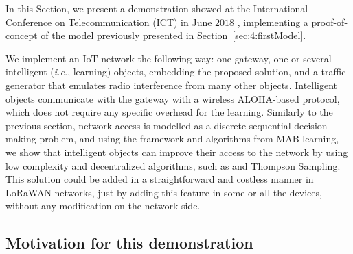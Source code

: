 

\graphicspath{{2-Chapters/4-Chapter/IEEE_WCNC_2019__DemoICT.git/pictures/}}

In this Section, we present a demonstration showed at the International Conference on Telecommunication (ICT) in June $2018$ \cite{Besson2018ICT,Besson2019WCNC}, implementing a proof-of-concept of the model previously presented in Section~\ref{sec:4:firstModel}.

We implement an IoT network the following way: one gateway, one or several intelligent (\emph{i.e.}, learning) objects, embedding the proposed solution,
and a traffic generator that emulates radio interference from many other objects.
Intelligent objects communicate with the gateway with a wireless ALOHA-based protocol, which does not require any specific overhead for the learning.
%
Similarly to the previous section, network access is modelled as a discrete sequential decision making problem, and using the framework and algorithms from MAB learning, we show that intelligent objects can improve their access to the network by using low complexity and decentralized algorithms, such as \UCB{} and Thompson Sampling.
%
This solution could be added in a straightforward and costless manner in LoRaWAN networks, just by adding this feature in some or all the devices, without any modification on the network side.







\subsection{Motivation for this demonstration}
\label{sub:42:motivation}

